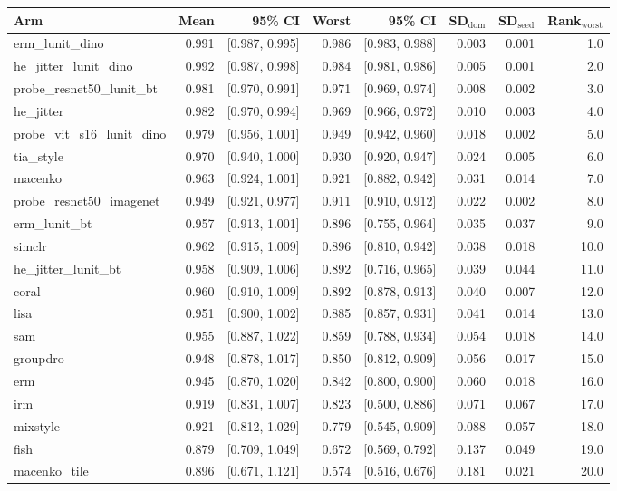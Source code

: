 \begin{tabular}{lrrrrrrr}
\toprule
Arm & Mean & 95\% CI & Worst & 95\% CI & SD$_\text{dom}$ & SD$_\text{seed}$ & Rank$_\text{worst}$ \\
\midrule
erm\_lunit\_dino & 0.991 & [0.987, 0.995] & 0.986 & [0.983, 0.988] & 0.003 & 0.001 & 1.0 \\
he\_jitter\_lunit\_dino & 0.992 & [0.987, 0.998] & 0.984 & [0.981, 0.986] & 0.005 & 0.001 & 2.0 \\
probe\_resnet50\_lunit\_bt & 0.981 & [0.970, 0.991] & 0.971 & [0.969, 0.974] & 0.008 & 0.002 & 3.0 \\
he\_jitter & 0.982 & [0.970, 0.994] & 0.969 & [0.966, 0.972] & 0.010 & 0.003 & 4.0 \\
probe\_vit\_s16\_lunit\_dino & 0.979 & [0.956, 1.001] & 0.949 & [0.942, 0.960] & 0.018 & 0.002 & 5.0 \\
tia\_style & 0.970 & [0.940, 1.000] & 0.930 & [0.920, 0.947] & 0.024 & 0.005 & 6.0 \\
macenko & 0.963 & [0.924, 1.001] & 0.921 & [0.882, 0.942] & 0.031 & 0.014 & 7.0 \\
probe\_resnet50\_imagenet & 0.949 & [0.921, 0.977] & 0.911 & [0.910, 0.912] & 0.022 & 0.002 & 8.0 \\
erm\_lunit\_bt & 0.957 & [0.913, 1.001] & 0.896 & [0.755, 0.964] & 0.035 & 0.037 & 9.0 \\
simclr & 0.962 & [0.915, 1.009] & 0.896 & [0.810, 0.942] & 0.038 & 0.018 & 10.0 \\
he\_jitter\_lunit\_bt & 0.958 & [0.909, 1.006] & 0.892 & [0.716, 0.965] & 0.039 & 0.044 & 11.0 \\
coral & 0.960 & [0.910, 1.009] & 0.892 & [0.878, 0.913] & 0.040 & 0.007 & 12.0 \\
lisa & 0.951 & [0.900, 1.002] & 0.885 & [0.857, 0.931] & 0.041 & 0.014 & 13.0 \\
sam & 0.955 & [0.887, 1.022] & 0.859 & [0.788, 0.934] & 0.054 & 0.018 & 14.0 \\
groupdro & 0.948 & [0.878, 1.017] & 0.850 & [0.812, 0.909] & 0.056 & 0.017 & 15.0 \\
erm & 0.945 & [0.870, 1.020] & 0.842 & [0.800, 0.900] & 0.060 & 0.018 & 16.0 \\
irm & 0.919 & [0.831, 1.007] & 0.823 & [0.500, 0.886] & 0.071 & 0.067 & 17.0 \\
mixstyle & 0.921 & [0.812, 1.029] & 0.779 & [0.545, 0.909] & 0.088 & 0.057 & 18.0 \\
fish & 0.879 & [0.709, 1.049] & 0.672 & [0.569, 0.792] & 0.137 & 0.049 & 19.0 \\
macenko\_tile & 0.896 & [0.671, 1.121] & 0.574 & [0.516, 0.676] & 0.181 & 0.021 & 20.0 \\
\bottomrule
\end{tabular}

